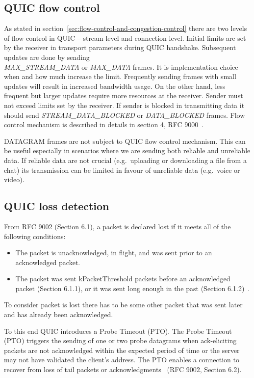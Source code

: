 \subsection{QUIC flow control}
\label{subsec:quic-flow-control}
As stated in section~\ref{sec:flow-control-and-congestion-control} there are two levels of flow control in QUIC -- stream level and connection level.
Initial limits are set by the receiver in transport parameters during QUIC handshake.
Subsequent updates are done by sending \\ \textit{MAX\_STREAM\_DATA} or \textit{MAX\_DATA} frames.
It is implementation choice when and how much increase the limit.
Frequently sending frames with small updates will result in increased bandwidth usage.
On the other hand, less frequent but larger updates require more resources at the receiver.
Sender must not exceed limits set by the receiver.
If sender is blocked in transmitting data it should send \textit{STREAM\_DATA\_BLOCKED} or \textit{DATA\_BLOCKED} frames.
Flow control mechanism is described in details in section 4, RFC 9000~\cite{rfc9000}.

DATAGRAM frames are not subject to QUIC flow control mechanism.
This can be useful especially in scenarios where we are sending both reliable and unreliable data.
If reliable data are not crucial (e.g.\ uploading or downloading a file from a chat) its transmission can be limited in favour of unreliable data (e.g.\ voice or video).

\subsection{QUIC loss detection}
\label{subsec:loss-detection}
From RFC 9002 (Section 6.1), a packet is declared lost if it meets all of the following conditions:
\begin{itemize}
    \item The packet is unacknowledged, in flight, and was sent prior to an acknowledged packet.
    \item The packet was sent kPacketThreshold packets before an acknowledged packet (Section 6.1.1), or it was sent long enough in the past (Section 6.1.2)~\cite{rfc9002}.
\end{itemize}

To consider packet is lost there has to be some other packet that was sent later and has already been acknowledged.

To this end QUIC introduces a Probe Timeout (PTO).
The Probe Timeout (PTO) triggers the sending of one or two probe datagrams when ack-eliciting packets are not acknowledged within the expected period of time or the server may not have validated the client's address.
The PTO enables a connection to recover from loss of tail packets or acknowledgments~\cite{rfc9002} (RFC 9002, Section 6.2).

